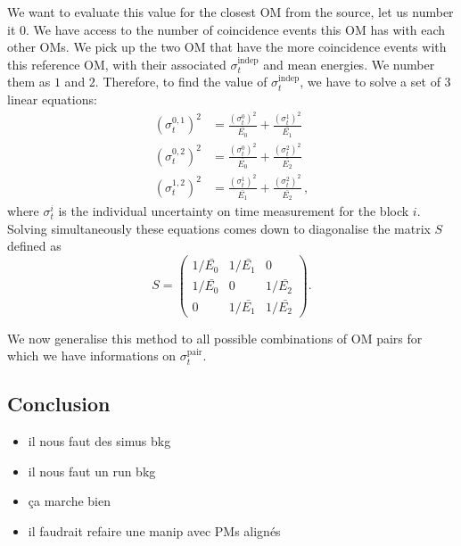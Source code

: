 We want to evaluate this value for the closest OM from the source, let us number it $0$.
We have access to the number of coincidence events this OM has with each other OMs.
We pick up the two OM that have the more coincidence events with this reference OM, with their associated $\sigma_{t}^{\text{indep}}$ and mean energies.
We number them as $1$ and $2$.
Therefore, to find the value of $\sigma_{t}^{\text{indep}}$, we have to solve a set of $3$ linear equations:
\begin{align}
  (\sigma_{t}^{0,1})^{2} &= \frac{(\sigma_{t}^{0})^{2}}{\bar{E_{0}}} + \frac{(\sigma_{t}^{1})^{2}}{\bar{E_{1}}}\nonumber \\
  (\sigma_{t}^{0,2})^{2} &= \frac{(\sigma_{t}^{0})^{2}}{\bar{E_{0}}} + \frac{(\sigma_{t}^{2})^{2}}{\bar{E_{2}}}\\
  (\sigma_{t}^{1,2})^{2} &= \frac{(\sigma_{t}^{1})^{2}}{\bar{E_{1}}} + \frac{(\sigma_{t}^{2})^{2}}{\bar{E_{2}}} \nonumber\,,
  \label{eq:Co_sigma}
\end{align}
where $\sigma_{t}^{i}$ is the individual uncertainty on time measurement for the block $i$.
Solving simultaneously these equations comes down to diagonalise the matrix $S$ defined as
\begin{equation}
  S =
  \begin{pmatrix}
    1/\bar{E_{0}} & 1/\bar{E_{1}} & 0 \\
    1/\bar{E_{0}} & 0 & 1/\bar{E_{2}} \\
    0 & 1/\bar{E_{1}} & 1/\bar{E_{2}}
  \end{pmatrix}
  .
\end{equation}

We now generalise this method to all possible combinations of OM pairs for which we have informations on $\sigma_{t}^{\text{pair}}$.


\subsection{Conclusion}
\begin{itemize}
\item il nous faut des simus bkg
\item il nous faut un run bkg
\item ça marche bien
\item il faudrait refaire une manip avec PMs alignés
\end{itemize}


